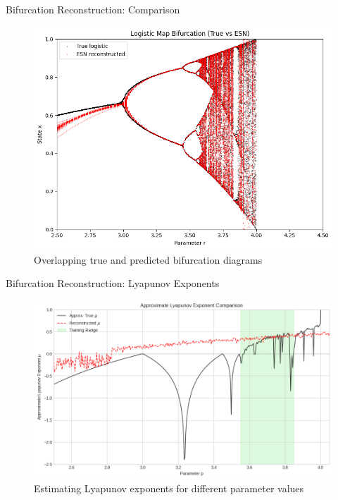 \documentclass{beamer}
\begin{document}
\begin{frame}{Bifurcation Reconstruction: Comparison}
\begin{figure}
\centering
\includegraphics[width=0.8\linewidth]{figures/bf_3_results_overlapped.png}
\caption{Overlapping true and predicted bifurcation diagrams}
\end{figure}
\end{frame}

\begin{frame}{Bifurcation Reconstruction: Lyapunov Exponents}
\begin{figure}
\centering
\includegraphics[width=1\linewidth]{figures/lyapanov_bd_rd.png}
\caption{Estimating Lyapunov exponents for different parameter values}
\end{figure}
\end{frame}
\end{document}
